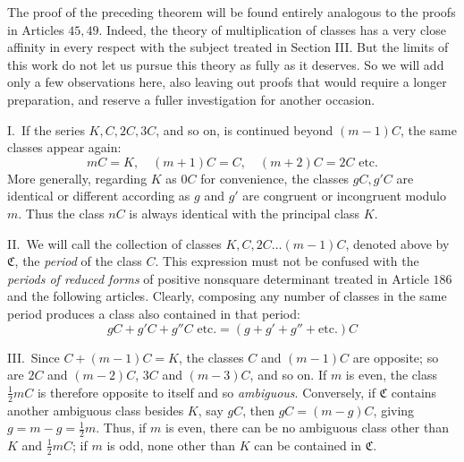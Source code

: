 The proof of the preceding theorem will be found entirely analogous to the proofs in Articles \(45,49\). Indeed, the theory of multiplication of classes has a very close affinity in every respect with the subject treated in Section III. But the limits of this work do not let us pursue this theory as fully as it deserves. So we will add only a few observations here, also leaving out proofs that would require a longer preparation, and reserve a fuller investigation for another occasion.

I.\ If the series \(K,C,2C,3C\), and so on, is continued beyond \((m-1)C\), the same classes appear again:
\[mC=K,\quad(m+1)C=C,\quad(m+2)C=2C\text{ etc.}\]
More generally, regarding \(K\) as \(0C\) for convenience, the classes \(gC,g'C\) are identical or different according as \(g\) and \(g'\) are congruent or incongruent modulo \(m\). Thus the class \(nC\) is always identical with the principal class \(K\).

II.\ We will call the collection of classes \(K,C,2C\ldots(m-1)C\), denoted above by \(\mathfrak C\), the \textit{period} of the class \(C\). This expression must not be confused with the \textit{periods of reduced forms} of positive nonsquare determinant treated in Article \(186\) and the following articles. Clearly, composing any number of classes in the same period produces a class also contained in that period:
\[gC+g'C+g''C\text{ etc.}=(g+g'+g''+\text{etc.})C\]


III.\ Since \(C+(m-1)C=K\), the classes \(C\) and \((m-1)C\) are opposite; so are \(2C\) and \((m-2)C\), \(3C\) and \((m-3)C\), and so on. If \(m\) is even, the class \(\tfrac12mC\) is therefore opposite to itself and so \textit{ambiguous}. Conversely, if \(\mathfrak C\) contains another ambiguous class besides \(K\), say \(gC\), then \(gC=(m-g)C\), giving \(g=m-g=\tfrac12m\). Thus, if \(m\) is even, there can be no ambiguous class other than \(K\) and \(\tfrac12mC\);
if \(m\) is odd, none other than \(K\) can be contained in \(\mathfrak C\).

